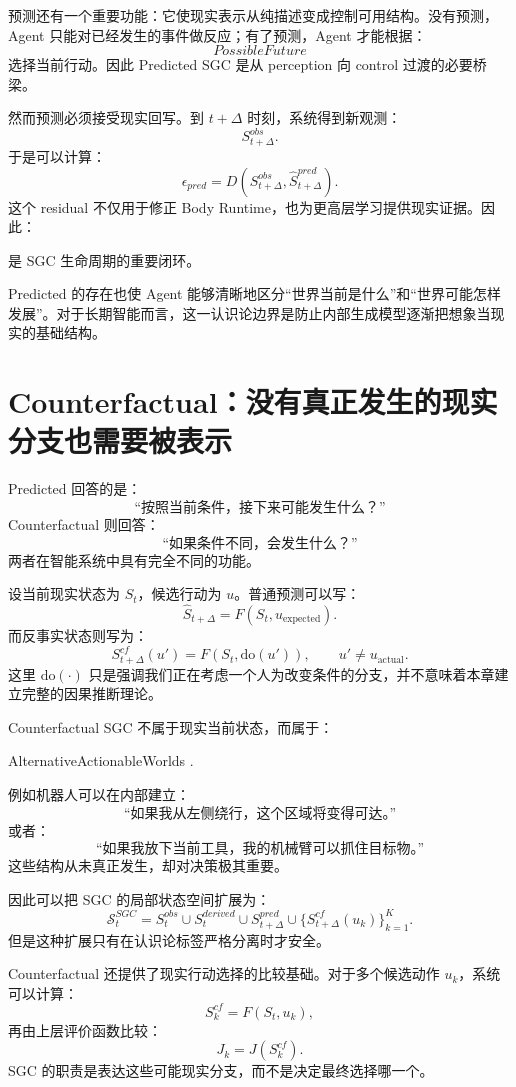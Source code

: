 预测还有一个重要功能：它使现实表示从纯描述变成控制可用结构。没有预测，Agent 只能对已经发生的事件做反应；有了预测，Agent 才能根据：
\[
PossibleFuture
\]
选择当前行动。因此 Predicted SGC 是从 perception 向 control 过渡的必要桥梁。

然而预测必须接受现实回写。到 $t+\Delta$ 时刻，系统得到新观测：
\[
S_{t+\Delta}^{obs}.
\]
于是可以计算：
\[
\epsilon_{pred}
=
D(
S_{t+\Delta}^{obs},
\hat S_{t+\Delta}^{pred}
).
\]
这个 residual 不仅用于修正 Body Runtime，也为更高层学习提供现实证据。因此：
\begin{statementbox}
\centering
{}
\end{statementbox}
是 SGC 生命周期的重要闭环。

Predicted 的存在也使 Agent 能够清晰地区分“世界当前是什么”和“世界可能怎样发展”。对于长期智能而言，这一认识论边界是防止内部生成模型逐渐把想象当现实的基础结构。

\section{Counterfactual：没有真正发生的现实分支也需要被表示}

Predicted 回答的是：
\[
\text{“按照当前条件，接下来可能发生什么？”}
\]
Counterfactual 则回答：
\[
\text{“如果条件不同，会发生什么？”}
\]
两者在智能系统中具有完全不同的功能。

设当前现实状态为 $S_t$，候选行动为 $u$。普通预测可以写：
\[
\hat S_{t+\Delta}
=
F(S_t,u_{\mathrm{expected}}).
\]
而反事实状态则写为：
\[
S^{cf}_{t+\Delta}(u')
=
F(S_t,\mathrm{do}(u')),
\qquad
u'\neq u_{\mathrm{actual}}.
\]
这里 $\mathrm{do}(\cdot)$ 只是强调我们正在考虑一个人为改变条件的分支，并不意味着本章建立完整的因果推断理论。

Counterfactual SGC 不属于现实当前状态，而属于：
\begin{statementbox}
AlternativeActionableWorlds .
\end{statementbox}
例如机器人可以在内部建立：
\[
\text{“如果我从左侧绕行，这个区域将变得可达。”}
\]
或者：
\[
\text{“如果我放下当前工具，我的机械臂可以抓住目标物。”}
\]
这些结构从未真正发生，却对决策极其重要。

因此可以把 SGC 的局部状态空间扩展为：
\[
\mathcal S_t^{SGC}
=
S_t^{obs}
\cup
S_t^{derived}
\cup
S_{t+\Delta}^{pred}
\cup
\{S_{t+\Delta}^{cf}(u_k)\}_{k=1}^{K}.
\]
但是这种扩展只有在认识论标签严格分离时才安全。

Counterfactual 还提供了现实行动选择的比较基础。对于多个候选动作 $u_k$，系统可以计算：
\[
S_k^{cf}=F(S_t,u_k),
\]
再由上层评价函数比较：
\[
J_k
=
J(S_k^{cf}).
\]
SGC 的职责是表达这些可能现实分支，而不是决定最终选择哪一个。

